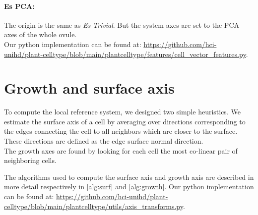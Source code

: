 \documentclass[10pt,twocolumn,letterpaper]{article}
\begin{document}
\paragraph{Es PCA:} The origin is the same as \textit{Es Trivial}. But the system axes are set to the PCA axes of the whole ovule.\\

Our python implementation can be found at: \url{https://github.com/hci-unihd/plant-celltype/blob/main/plantcelltype/features/cell_vector_features.py}.\\


\section{Growth and surface axis}
\label{suppl:sec2}
To compute the local reference system, we designed two simple heuristics. 
We estimate the surface axis of a cell by averaging over directions corresponding to the edges connecting the cell to all neighbors which are closer to the surface. These directions are defined as the edge surface normal direction.\\ 
The growth axes are found by looking for each cell the most co-linear pair of neighboring cells.

The algorithms used to compute the surface axis and growth axis are described in more detail respectively in \cref{alg:surf} and \cref{alg:growth}. Our python implementation can be found at:
\url{https://github.com/hci-unihd/plant-celltype/blob/main/plantcelltype/utils/axis_transforms.py}.
\end{document}
